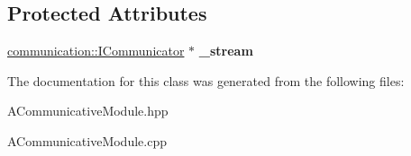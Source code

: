 \subsection*{Protected Attributes}
\begin{DoxyCompactItemize}
\item 
\mbox{\label{classwood_box_1_1module_1_1_a_communicative_module_a2eb402d7af8591b0935e79c63be06bf8}} 
\mbox{\hyperlink{classwood_box_1_1communication_1_1_i_communicator}{communication\+::\+I\+Communicator}} $\ast$ {\bfseries \+\_\+stream}
\end{DoxyCompactItemize}


The documentation for this class was generated from the following files\+:\begin{DoxyCompactItemize}
\item 
A\+Communicative\+Module.\+hpp\item 
A\+Communicative\+Module.\+cpp\end{DoxyCompactItemize}
